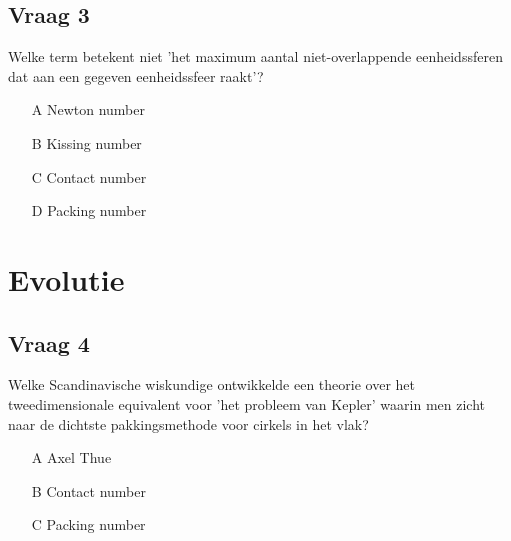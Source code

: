 \documentclass[dutch]{beamer}
\begin{document}
\subsection{Vraag 3 }
\begin{frame}

\begin{block}
{Welke term betekent niet 'het maximum aantal niet-overlappende eenheidssferen dat aan een gegeven eenheidssfeer raakt'?}

\begin{itemize}
	\item[A] Newton number
	\item[B] Kissing number
	\item[C] Contact number
	\item[D] Packing number
	\end{itemize}
\end{block}

\end{frame}

\section{Evolutie}
\subsection{Vraag 4}
\begin{frame}

\begin{block}
{Welke Scandinavische wiskundige ontwikkelde een theorie over het tweedimensionale equivalent voor 'het probleem van Kepler' waarin men zicht naar de dichtste pakkingsmethode voor cirkels in het vlak?}

\begin{itemize}
	\item[A] Axel Thue
	\item[B] Contact number
	\item[C] Packing number
	\end{itemize}
\end{block}

\end{frame}
\end{document}
